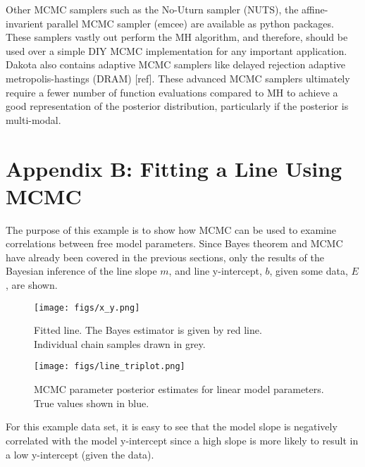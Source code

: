 \documentclass[10pt,a4paper]{report}
\begin{document}
\begin{tiny}

\end{tiny}


Other MCMC samplers such as the No-Uturn sampler (NUTS), the affine-invarient parallel MCMC sampler (emcee) are available as python packages.  These samplers vastly out perform the MH algorithm, and therefore, should be used over a simple DIY MCMC implementation for any important application.  Dakota also contains adaptive MCMC samplers like delayed rejection adaptive metropolis-hastings (DRAM) [ref].  These advanced MCMC samplers ultimately require a fewer number of function evaluations compared to MH to achieve a good representation of the posterior distribution, particularly if the posterior is multi-modal.

\chapter{Appendix B: Fitting a Line Using MCMC}

The purpose of this example is to show how MCMC can be used to examine correlations between free model parameters.  Since Bayes theorem and MCMC have already been covered in the previous sections, only the results of the Bayesian inference of the line slope $m$, and line y-intercept, $b$, given some data, $E$, are shown.


\begin{figure}[h]
    \centering
    \begin{minipage}{.5\textwidth}
    \texttt{[image: figs/x\_y.png]}
    \caption{Fitted line.  The Bayes estimator is given by red line. \\
     Individual chain samples drawn in grey.  \label{fig:x_y}}
    \end{minipage}%
    \begin{minipage}{.5\textwidth}
    \texttt{[image: figs/line\_triplot.png]}
    \caption{MCMC parameter posterior estimates for linear model parameters.  \\
    True values shown in blue.  \label{fig:line_triplot}}
    \end{minipage}
\end{figure}

For this example data set, it is easy to see that the model slope is negatively correlated with the model y-intercept since a high slope is more likely to result in a low y-intercept (given the data).
\end{document}
